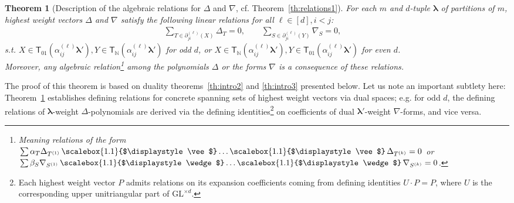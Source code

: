 \documentclass[12pt, reqno]{amsart}
\newtheorem{theorem}{Theorem}[section]
\theoremstyle{definition}
\let\oldwedge\wedge
\let\oldvee\vee
\renewcommand{\wedge}{
  \mathop{
    \vcenter{
      \hbox{\scalebox{1.1}{$\displaystyle\oldwedge$}}
    }
  }
}
\renewcommand{\vee}{
  \mathop{
    \vcenter{
      \hbox{\scalebox{1.1}{$\displaystyle\oldvee$}}
    }
  }
}
\begin{document}
\begin{theorem}[Description of the algebraic relations for $\Delta$ and $\nabla$, cf. Theorem~\ref{th:relations1}]\label{th:relations-intro}
For each $m$ and $d$-tuple $\pmb{\lambda}$ of partitions of $m$, %
highest weight vectors $\Delta$ and $\nabla$ satisfy the following linear relations for all $\ell \in [d], i < j $: 
\begin{align*}
\sum_{T \in \partial^{(\ell)}_{j i}(X)} \Delta_T = 0, \qquad %
\sum_{S \in \partial^{(\ell)}_{j i}(Y)} \nabla_S = 0, \quad %
\end{align*}
s.t. {\small $X \in \mathsf{T}_{01}(\alpha^{(\ell)}_{i j} \pmb{\lambda'} ), Y \in \mathsf{T}_{\mathbb{N}}(\alpha^{(\ell)}_{i j} \pmb{\lambda'} )$}
for odd $d$, or {\small $X \in \mathsf{T}_{\mathbb{N}}(\alpha^{(\ell)}_{i j} \pmb{\lambda'} ), Y \in \mathsf{T}_{01}(\alpha^{(\ell)}_{i j} \pmb{\lambda'} )$} for even $d$. \\
Moreover, any algebraic relation\footnote{Meaning relations of the form $\sum \alpha_T \Delta_{T^{(1)}} \vee\ldots \vee\Delta_{T^{(k)}} = 0$ or $\sum \beta_S \nabla_{S^{(1)}}\wedge\ldots\wedge\nabla_{S^{(k)}} = 0$.} among the polynomials $\Delta$ or the forms $\nabla$ is a consequence of these relations. 

\end{theorem}

The proof of this theorem is based on duality theorems~\ref{th:intro2} and \ref{th:intro3} presented below. 
Let us note an important subtlety here: Theorem~\ref{th:relations-intro}  establishes defining relations for concrete spanning sets of highest weight vectors via dual spaces; e.g. for odd $d$, the defining relations of $\pmb{\lambda}$-weight $\Delta$-polynomials are derived via the defining identities\footnote{ Each highest weight vector $P$ %
admits relations on its expansion coefficients coming from defining identities $U \cdot P = P$, where $U$ is the corresponding upper unitriangular part of $\mathrm{GL}^{\times d}$. } 
on coefficients of dual $\pmb{\lambda'}$-weight $\nabla$-forms, and vice versa.  %
\end{document}
